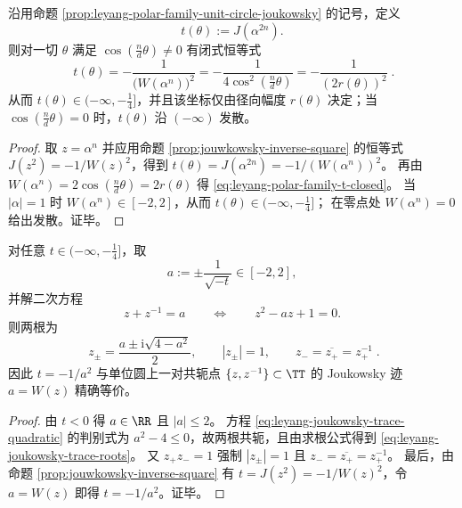 \begin{proposition}[奇异环坐标门下的显式推前]\label{prop:leyang-polar-family-pushforward-to-singular-ring}
沿用命题 \ref{prop:leyang-polar-family-unit-circle-joukowsky} 的记号，定义
\begin{equation}\label{eq:leyang-polar-family-t-def}
t(\theta):=J(\alpha^{2n}).
\end{equation}
则对一切 \(\theta\) 满足 \(\cos(\frac{n}{d}\theta)\neq 0\) 有闭式恒等式
\begin{equation}\label{eq:leyang-polar-family-t-closed}
\boxed{\;
t(\theta)
=-\frac{1}{\bigl(W(\alpha^n)\bigr)^2}
=-\frac{1}{4\cos^2(\frac{n}{d}\theta)}
=-\frac{1}{(2r(\theta))^2}\; }.
\end{equation}
从而 \(t(\theta)\in(-\infty,-\tfrac14]\)，并且该坐标仅由径向幅度 \(r(\theta)\) 决定；当 \(\cos(\frac{n}{d}\theta)=0\) 时，\(t(\theta)\) 沿 \((-\infty)\) 发散。
\end{proposition}
\begin{proof}
取 \(z=\alpha^n\) 并应用命题 \ref{prop:jouwkowsky-inverse-square} 的恒等式 \(J(z^2)=-1/W(z)^2\)，得到
\(
t(\theta)=J(\alpha^{2n})=-1/(W(\alpha^n))^2
\)。
再由 \(W(\alpha^n)=2\cos(\frac{n}{d}\theta)=2r(\theta)\) 得 \eqref{eq:leyang-polar-family-t-closed}。
当 \(|\alpha|=1\) 时 \(W(\alpha^n)\in[-2,2]\)，从而 \(t(\theta)\in(-\infty,-\tfrac14]\)；
在零点处 \(W(\alpha^n)=0\) 给出发散。证毕。
\end{proof}

\begin{lemma}[奇异环到单位圆的显式反演]\label{lem:leyang-singular-ring-inversion}
对任意 \(t\in(-\infty,-\tfrac14]\)，取
\[
a:=\pm\frac{1}{\sqrt{-t}}\in[-2,2],
\]
并解二次方程
\begin{equation}\label{eq:leyang-joukowsky-trace-quadratic}
z+z^{-1}=a\qquad\Longleftrightarrow\qquad z^2-az+1=0.
\end{equation}
则两根为
\begin{equation}\label{eq:leyang-joukowsky-trace-roots}
\boxed{\;
z_{\pm}=\frac{a\pm \mathrm{i}\sqrt{4-a^2}}{2},\qquad |z_{\pm}|=1,\qquad z_-=\overline{z_+}=z_+^{-1}\; }.
\end{equation}
因此 \(t=-1/a^2\) 与单位圆上一对共轭点 \(\{z,z^{-1}\}\subset\TT\) 的 Joukowsky 迹 \(a=W(z)\) 精确等价。
\end{lemma}
\begin{proof}
由 \(t<0\) 得 \(a\in\RR\) 且 \(|a|\le 2\)。
方程 \eqref{eq:leyang-joukowsky-trace-quadratic} 的判别式为 \(a^2-4\le 0\)，故两根共轭，且由求根公式得到 \eqref{eq:leyang-joukowsky-trace-roots}。
又 \(z_+z_-=1\) 强制 \(|z_{\pm}|=1\) 且 \(z_-=\overline{z_+}=z_+^{-1}\)。
最后，由命题 \ref{prop:jouwkowsky-inverse-square} 有 \(t=J(z^2)=-1/W(z)^2\)，令 \(a=W(z)\) 即得 \(t=-1/a^2\)。证毕。
\end{proof}

